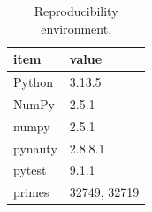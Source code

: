 \begin{table}[t]
\centering
\begin{tabular}{ll}
\toprule
item & value \\
\midrule
Python & 3.13.5 \\
NumPy & 2.5.1 \\
numpy & 2.5.1 \\
pynauty & 2.8.8.1 \\
pytest & 9.1.1 \\
primes & 32749, 32719 \\
\bottomrule
\end{tabular}
\caption{Reproducibility environment.}
\label{tab:env}
\end{table}
